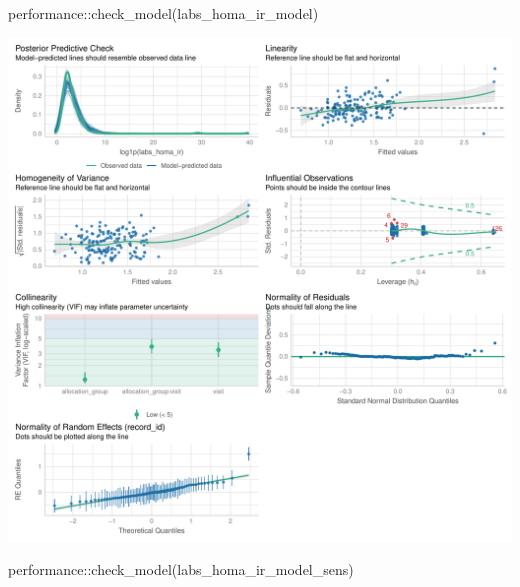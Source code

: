 \documentclass[
  letterpaper,
  DIV=11,
  numbers=noendperiod]{scrartcl}
\newenvironment{Shaded}{\begin{snugshade}}{\end{snugshade}}
\newcommand{\FunctionTok}[1]{\textcolor[rgb]{0.28,0.35,0.67}{#1}}
\newcommand{\NormalTok}[1]{\textcolor[rgb]{0.00,0.23,0.31}{#1}}
\newcommand{\SpecialCharTok}[1]{\textcolor[rgb]{0.37,0.37,0.37}{#1}}
\begin{document}
\begin{Shaded}
\begin{Highlighting}[]
\NormalTok{performance}\SpecialCharTok{::}\FunctionTok{check\_model}\NormalTok{(labs\_homa\_ir\_model)}
\end{Highlighting}
\end{Shaded}

\includegraphics{Outcomes_V1V2V3_files/figure-pdf/labs_homa_ir_4-1.pdf}

\begin{Shaded}
\begin{Highlighting}[]
\NormalTok{performance}\SpecialCharTok{::}\FunctionTok{check\_model}\NormalTok{(labs\_homa\_ir\_model\_sens)}
\end{Highlighting}
\end{Shaded}
\end{document}
